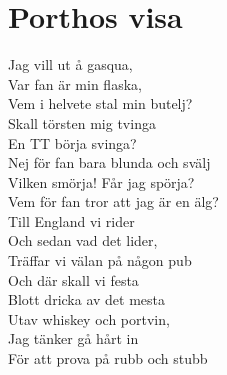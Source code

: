 \section{Porthos visa}
Jag vill ut å gasqua,\\
Var fan är min flaska,\\
Vem i helvete stal min butelj?\\
Skall törsten mig tvinga\\
En TT börja svinga?\\
Nej för fan bara blunda och svälj\\
Vilken smörja! Får jag spörja?\\
Vem för fan tror att jag är en älg?\\
Till England vi rider\\
Och sedan vad det lider,\\
Träffar vi välan på någon pub\\
Och där skall vi festa\\
Blott dricka av det mesta\\
Utav whiskey och portvin,\\
Jag tänker gå hårt in\\
För att prova på rubb och stubb\\
